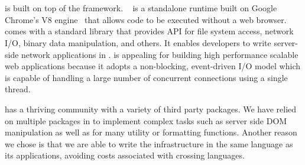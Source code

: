 





\section{\nodejs}

\cb is built on top of the \nodejs framework. \nodejs~\cite{tilkov2010node} is
a standalone \js runtime built on Google Chrome's V8 \js engine~\cite{v8} that
allows \js code to be executed without a web browser.  \nodejs comes with a
standard library that provides API for file system access, network I/O, binary
data manipulation, and others. It enables developers to write server-side network
applications in \js.  \nodejs is appealing for building high performance
scalable web applications because it adopts a non-blocking, event-driven I/O
model which is capable of handling a large number of concurrent connections
using a single thread.

\nodejs has a thriving community with a variety of third party packages.
We have relied on multiple packages in \cb to implement complex tasks such as
server side DOM manipulation as well as for many utility or formatting functions. 
Another reason we chose \nodejs is that we are able to write the \cb infrastructure 
in the same language as its applications, avoiding costs associated with
crossing languages.

